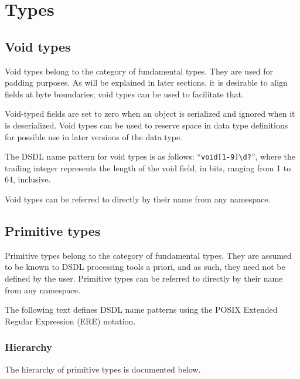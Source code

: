 \section{Types}

\subsection{Void types}

Void types belong to the category of fundamental types.
They are used for padding purposes.
As will be explained in later sections, it is desirable to align fields at byte boundaries;
void types can be used to facilitate that.

Void-typed fields are set to zero when an object is serialized and ignored when it is deserialized.
Void types can be used to reserve space in data type definitions for possible use in later versions of the data type.

The DSDL name pattern for void types is as follows: ``\verb|void[1-9]\d?|'',
where the trailing integer represents the length of the void field, in bits,
ranging from 1 to 64, inclusive.

Void types can be referred to directly by their name from any namespace.

\subsection{Primitive types}

Primitive types belong to the category of fundamental types.
They are assumed to be known to DSDL processing tools a priori,
and as such, they need not be defined by the user.
Primitive types can be referred to directly by their name from any namespace.

The following text defines DSDL name patterns using the POSIX Extended Regular Expression (ERE) notation.

\subsubsection{Hierarchy}

The hierarchy of primitive types is documented below.

